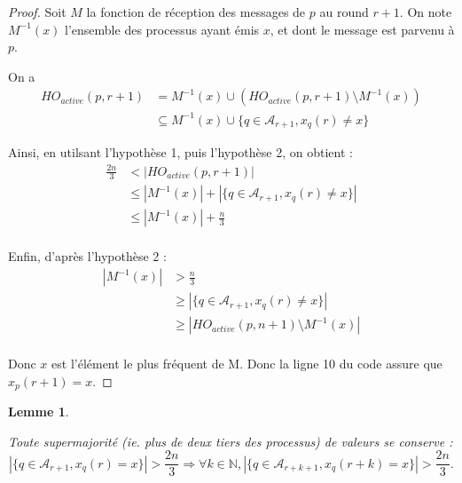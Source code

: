 \documentclass{article}
\newtheorem{lemma}{Lemme}
\begin{document}
\begin{proof}

	Soit $M$ la fonction de réception des messages de $p$ au round $r+1$. On note $M^{-1}(x)$ l'ensemble des processus ayant émis $x$, et dont le message est parvenu à $p$.

	On a
\begin{equation}
\begin{split}
	HO_{active}(p, r+1) & = M^{-1}(x) \cup (HO_{active}(p, r+1) \setminus M^{-1}(x)) \\
	& \subseteq M^{-1}(x) \cup \{ q \in \mathcal{A}_{r+1} , x_q(r) \neq x \}
\end{split}
\end{equation}

	Ainsi, en utilsant l'hypothèse 1, puis l'hypothèse 2, on obtient : 
\begin{equation}
\begin{split}
\frac{2 n}{3} & < | HO_{active}(p, r+1) | \\
		& \leq | M^{-1}(x) | + | \{ q \in \mathcal{A}_{r+1} , x_q(r) \neq x \} | \\
		& \leq | M^{-1}(x) | +  \frac{ n}{3} \\
\end{split}
\end{equation}


	Enfin, d'après l'hypothèse 2 :
\begin{equation}
\begin{split}
| M^{-1}(x) | & > \frac{ n}{3} \\
		& \geq | \{ q \in \mathcal{A}_{r+1} , x_q(r) \neq x \} | \\
		& \geq | HO_{active}(p,n+1) \setminus M^{-1}(x) | \\
\end{split}
\end{equation}

Donc $x$ est l'élément le plus fréquent de M. Donc la ligne 10 du code assure que $x_p(r+1) = x$.

\end{proof}

\begin{lemma}\label{lem:supcons}

Toute supermajorité (ie. plus de deux tiers des processus) de valeurs se conserve :
	$$ | \{ q \in \mathcal{A}_{r+1} , x_q(r) = x \} | > 
	\frac{2 n}{3} \Rightarrow \forall k \in \mathds{N}, | \{ q \in \mathcal{A}_{r+k+1} , x_q(r+k) = x \} | > \frac{2 n}{3} . $$

\end{lemma}
\end{document}
